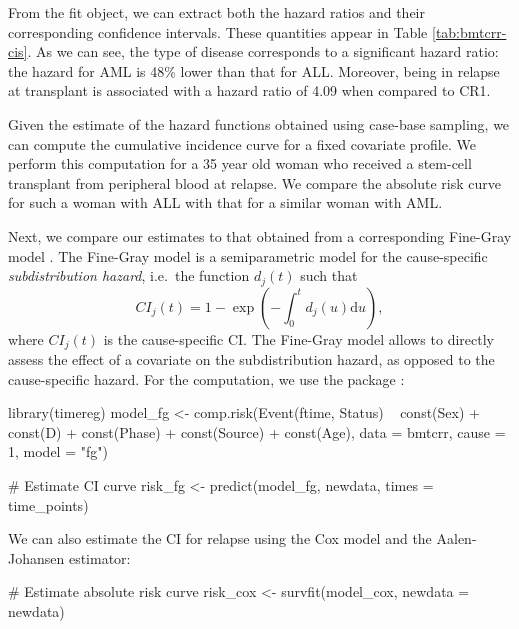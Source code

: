 From the fit object, we can extract both the hazard ratios and their
corresponding confidence intervals. These quantities appear in Table
\ref{tab:bmtcrr-cis}. As we can see, the type of disease corresponds to
a significant hazard ratio: the hazard for AML is 48\% lower than that
for ALL. Moreover, being in relapse at transplant is associated with a
hazard ratio of 4.09 when compared to CR1.

Given the estimate of the hazard functions obtained using case-base
sampling, we can compute the cumulative incidence curve for a fixed
covariate profile. We perform this computation for a 35 year old woman
who received a stem-cell transplant from peripheral blood at relapse. We
compare the absolute risk curve for such a woman with ALL with that for
a similar woman with AML.

Next, we compare our estimates to that obtained from a corresponding
Fine-Gray model \citeyearpar{fine1999proportional}. The Fine-Gray model
is a semiparametric model for the cause-specific \emph{subdistribution
hazard}, i.e.~the function \(d_j(t)\) such that
\[CI_j(t) = 1 - \exp\left( - \int_0^t d_j(u) \textrm{d}u \right),\]
where \(CI_j(t)\) is the cause-specific CI. The Fine-Gray model allows
to directly assess the effect of a covariate on the subdistribution
hazard, as opposed to the cause-specific hazard. For the computation, we
use the  package \citep{timereg}:

\begin{Schunk}
\begin{Sinput}
library(timereg)
model_fg <- comp.risk(Event(ftime, Status) ~ const(Sex) + const(D) +
                        const(Phase) + const(Source) + const(Age),
                      data = bmtcrr, cause = 1, model = "fg")

# Estimate CI curve
risk_fg <- predict(model_fg, newdata, times = time_points)
\end{Sinput}
\end{Schunk}

We can also estimate the CI for relapse using the Cox model and the
Aalen-Johansen estimator:

\begin{Schunk}
\begin{Sinput}
# Estimate absolute risk curve
risk_cox <- survfit(model_cox, newdata = newdata)
\end{Sinput}
\end{Schunk}

